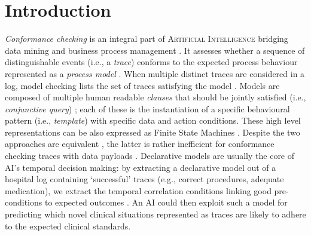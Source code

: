 \section{Introduction}

\textit{Conformance checking} is an integral part of \textsc{Artificial Intelligence} {bridging} data mining and business process management \cite{bpm21}. It assesses whether a sequence of distinguishable events (i.e., a \textit{trace}) conforms to the expected process behaviour represented as a \textit{process model} \cite{RozinatA08}. When multiple distinct traces are considered in a log, model checking lists the set of traces satisfying the model \cite{BurattinMS16}. Models are composed of multiple human readable \textit{clauses} that should be  jointly satisfied (i.e., \textit{conjunctive query}) \cite{Li2020}; each of these is the instantiation of a specific behavioural pattern (i.e., \textit{template}) with specific data and action conditions. These high level representations can be also expressed as Finite State Machines \cite{MultiPerspective}. %
{Despite the two approaches are equivalent}  \cite{AgostinelliBFMM21}, {the latter is rather inefficient for conformance checking traces with data payloads} \cite{bpm21}. %
{Declarative models are usually   the core} of AI's temporal decision making: by extracting a declarative model out of a hospital log \cite{mining} containing `successful' traces (e.g., correct procedures, adequate medication), we extract the temporal correlation conditions linking good pre-conditions to expected outcomes  \cite{Amantea2020}. An AI could then exploit such a model
for predicting which novel clinical situations represented as %
traces are likely to adhere to the expected clinical standards.

